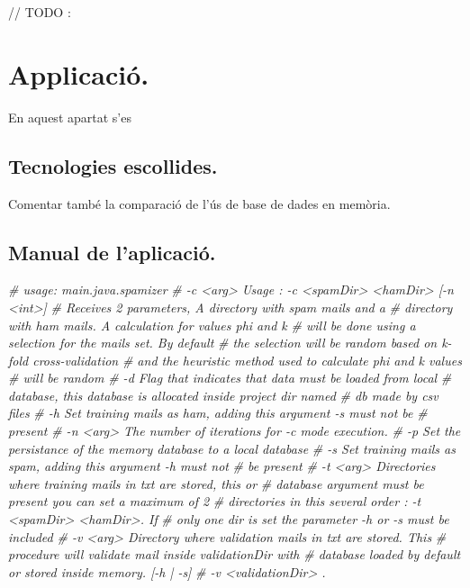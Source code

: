 \documentclass[]{article}
\newenvironment{Shaded}{\begin{snugshade}}{\end{snugshade}}
\newcommand{\CommentTok}[1]{\textcolor[rgb]{0.56,0.35,0.01}{\textit{#1}}}
\begin{document}
// TODO :

\hypertarget{applicacio.}{%
\section{Applicació.}\label{applicacio.}}

En aquest apartat s'es

\hypertarget{tecnologies-escollides.}{%
\subsection{Tecnologies escollides.}\label{tecnologies-escollides.}}

Comentar també la comparació de l'ús de base de dades en memòria.

\hypertarget{manual-de-laplicacio.}{%
\subsection{Manual de l'aplicació.}\label{manual-de-laplicacio.}}

\begin{Shaded}
\begin{Highlighting}[]
\CommentTok{# usage: main.java.spamizer}
\CommentTok{#  -c <arg>   Usage : -c <spamDir> <hamDir> [-n <int>]}
\CommentTok{#             Receives 2 parameters, A directory with spam mails and a}
\CommentTok{#             directory with ham mails. A calculation for values phi and k}
\CommentTok{#             will be done using a selection for the mails set. By default}
\CommentTok{#             the selection will be random based on k-fold cross-validation}
\CommentTok{#             and the heuristic method used to calculate phi and k values}
\CommentTok{#             will be random}
\CommentTok{#  -d         Flag that indicates that data must be loaded from local}
\CommentTok{#             database, this database is allocated inside project dir named}
\CommentTok{#             db made by csv files}
\CommentTok{#  -h         Set training mails as ham, adding this argument -s must not be}
\CommentTok{#             present}
\CommentTok{#  -n <arg>   The number of iterations for -c mode execution.}
\CommentTok{#  -p         Set the persistance of the memory database to a local database}
\CommentTok{#  -s         Set training mails as spam, adding this argument -h must not}
\CommentTok{#             be present}
\CommentTok{#  -t <arg>   Directories where training mails in txt are stored, this or}
\CommentTok{#             database argument must be present you can set a maximum of 2}
\CommentTok{#             directories in this several order : -t <spamDir> <hamDir>. If}
\CommentTok{#             only one dir is set the parameter -h or -s must be included}
\CommentTok{#  -v <arg>   Directory where validation mails in txt are stored. This}
\CommentTok{#             procedure will validate mail inside validationDir with}
\CommentTok{#             database loaded by default or stored inside memory. [-h | -s]}
\CommentTok{#             -v <validationDir> .}
\end{Highlighting}
\end{Shaded}
\end{document}
